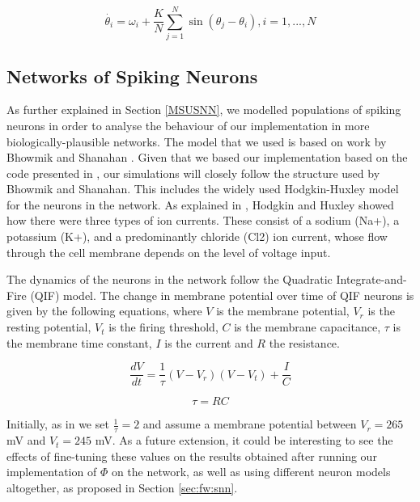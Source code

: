 \documentclass[a4paper,11pt]{article}
\begin{document}
\begin{equation} \label{eq:kuramoto}
\dot{\theta_i} = \omega_i + \frac{K}{N} \sum_{j=1}^{N} \sin(\theta_j - \theta_i), i = 1, ..., N
\end{equation}

\subsection{Networks of Spiking Neurons}
\label{sec:bg:snn}
As further explained in Section \ref{MSUSNN}, we modelled populations of spiking neurons in order to analyse the behaviour of our implementation in more biologically-plausible networks. The model that we used is based on work by Bhowmik and Shanahan \cite{Bhowmik2013}. Given that we based our implementation based on the code presented in \cite{Bhowmik2013}, our simulations will closely follow the structure used by Bhowmik and Shanahan. This includes the widely used Hodgkin-Huxley model \cite{Hodgkin1952} for the neurons in the network. As explained in \cite{Bhowmik2013}, Hodgkin and Huxley showed how there were three types of ion currents. These consist of a sodium (Na+), a potassium (K+), and a predominantly chloride (Cl2) ion current, whose flow through the cell membrane depends on the level of voltage input.

The dynamics of the neurons in the network follow the Quadratic Integrate-and-Fire (QIF) model. The change in membrane potential over time of QIF neurons is given by the following equations, where $V$ is the membrane potential, $V_r$ is the resting potential, $V_t$ is the firing threshold, $C$ is the membrane capacitance, $\tau$ is the membrane time  constant, $I$ is the current and $R$ the resistance.

\begin{equation} \label{eq:qif}
\frac{dV}{dt} = \frac{1}{\tau}(V - V_ r)(V-V_t) +  \frac{I}{C}
\end{equation}

\begin{equation} \label{eq:tau}
\tau = RC
\end{equation}

Initially, as in \cite{Bhowmik2013} we set $\frac{1}{\tau} = 2$ and assume a membrane potential between $V_r = 265$ mV and $V_t = 245$ mV. As a future extension, it could be interesting to see the effects of fine-tuning these values on the results obtained after running our implementation of $\Phi$ on the network, as well as using different neuron models altogether, as proposed in Section \ref{sec:fw:snn}.
\end{document}

